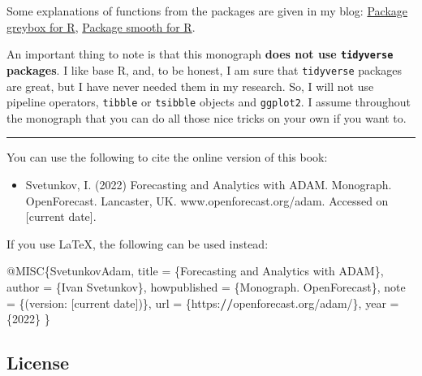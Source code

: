 \documentclass[
]{book}
\newenvironment{Shaded}{\begin{snugshade}}{\end{snugshade}}
\newcommand{\DecValTok}[1]{\textcolor[rgb]{0.00,0.00,0.81}{#1}}
\newcommand{\ErrorTok}[1]{\textcolor[rgb]{0.64,0.00,0.00}{\textbf{#1}}}
\newcommand{\NormalTok}[1]{#1}
\newcommand{\OtherTok}[1]{\textcolor[rgb]{0.56,0.35,0.01}{#1}}
\newcommand{\SpecialCharTok}[1]{\textcolor[rgb]{0.00,0.00,0.00}{#1}}
\providecommand{\tightlist}{%
  \setlength{\itemsep}{0pt}\setlength{\parskip}{0pt}}
\theoremstyle{definition}
\theoremstyle{definition}
\theoremstyle{definition}
\theoremstyle{definition}
\theoremstyle{remark}
\begin{document}
Some explanations of functions from the packages are given in my blog: \href{https://forecasting.svetunkov.ru/en/category/r-en/greybox/}{Package greybox for R}, \href{https://forecasting.svetunkov.ru/en/category/r-en/smooth/}{Package smooth for R}.

An important thing to note is that this monograph \textbf{does not use \texttt{tidyverse} packages}. I like base R, and, to be honest, I am sure that \texttt{tidyverse} packages are great, but I have never needed them in my research. So, I will not use pipeline operators, \texttt{tibble} or \texttt{tsibble} objects and \texttt{ggplot2}. I assume throughout the monograph that you can do all those nice tricks on your own if you want to.

\begin{center}\rule{0.5\linewidth}{0.5pt}\end{center}

You can use the following to cite the online version of this book:

\begin{itemize}
\tightlist
\item
  Svetunkov, I. (2022) Forecasting and Analytics with ADAM. Monograph. OpenForecast. Lancaster, UK. www.openforecast.org/adam. Accessed on {[}current date{]}.
\end{itemize}

If you use LaTeX, the following can be used instead:

\begin{Shaded}
\begin{Highlighting}[]
\SpecialCharTok{@}\NormalTok{MISC\{SvetunkovAdam,}
\NormalTok{    title }\OtherTok{=}\NormalTok{ \{Forecasting and Analytics with ADAM\},}
\NormalTok{    author }\OtherTok{=}\NormalTok{ \{Ivan Svetunkov\},}
\NormalTok{    howpublished }\OtherTok{=}\NormalTok{ \{Monograph. OpenForecast\},}
\NormalTok{    note }\OtherTok{=}\NormalTok{ \{(version}\SpecialCharTok{:}\NormalTok{ [current date])\},}
\NormalTok{    url }\OtherTok{=}\NormalTok{ \{https}\SpecialCharTok{:}\ErrorTok{//}\NormalTok{openforecast.org}\SpecialCharTok{/}\NormalTok{adam}\SpecialCharTok{/}\NormalTok{\},}
\NormalTok{    year }\OtherTok{=}\NormalTok{ \{}\DecValTok{2022}\NormalTok{\}}
\NormalTok{\}}
\end{Highlighting}
\end{Shaded}

\hypertarget{license}{%
\subsection*{License}\label{license}}
\end{document}
